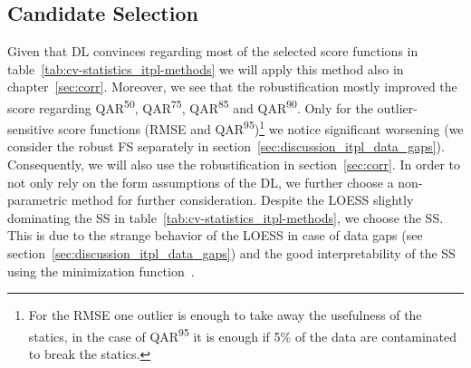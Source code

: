 {    \subsection{Candidate Selection}{\label{sec:itpl_candiate_selection}
        Given that DL convinces regarding most of the selected score functions in table~\ref{tab:cv-statistics_itpl-methods} we will apply this method also in chapter~\ref{sec:corr}. Moreover, we see that the robustification mostly improved the score regarding QAR\textsuperscript{50}, QAR\textsuperscript{75}, QAR\textsuperscript{85} and QAR\textsuperscript{90}. Only for the outlier-sensitive score functions (RMSE and QAR\textsuperscript{95})\footnote{For the RMSE one outlier is enough to take away the usefulness of the statics, in the case of QAR\textsuperscript{95} it is enough if 5\% of the data are contaminated to break the statics.} we notice significant worsening (we consider the robust FS separately in section~\ref{sec:discussion_itpl_data_gaps}). Consequently, we will also use the robustification in section~\ref{sec:corr}.
        In order to not only rely on the form assumptions of the DL, we further choose a non-parametric method for further consideration. Despite the LOESS slightly dominating the SS in table~\ref{tab:cv-statistics_itpl-methods}, we choose the SS. This is due to the strange behavior of the LOESS in case of data gaps (see section~\ref{sec:discussion_itpl_data_gaps}) and the good interpretability of the SS using the minimization function~.
    }
}


